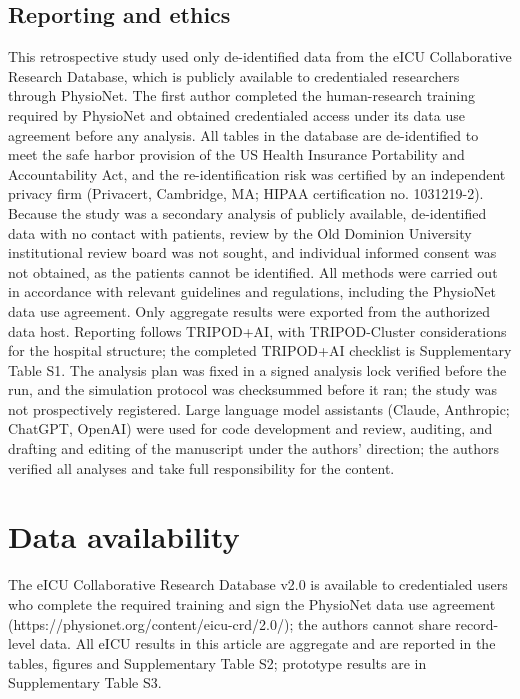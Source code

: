 \documentclass[11pt]{article}
\begin{document}
\subsection*{Reporting and ethics}
This retrospective study used only de-identified data from the eICU Collaborative Research Database, which is publicly available to credentialed researchers through PhysioNet\cite{r1}. The first author completed the human-research training required by PhysioNet and obtained credentialed access under its data use agreement before any analysis. All tables in the database are de-identified to meet the safe harbor provision of the US Health Insurance Portability and Accountability Act, and the re-identification risk was certified by an independent privacy firm (Privacert, Cambridge, MA; HIPAA certification no. 1031219-2)\cite{r2}. Because the study was a secondary analysis of publicly available, de-identified data with no contact with patients, review by the Old Dominion University institutional review board was not sought, and individual informed consent was not obtained, as the patients cannot be identified. All methods were carried out in accordance with relevant guidelines and regulations, including the PhysioNet data use agreement. Only aggregate results were exported from the authorized data host. Reporting follows TRIPOD+AI, with TRIPOD-Cluster considerations for the hospital structure\cite{r9,r19}; the completed TRIPOD+AI checklist is Supplementary Table S1. The analysis plan was fixed in a signed analysis lock verified before the run, and the simulation protocol was checksummed before it ran; the study was not prospectively registered. Large language model assistants (Claude, Anthropic; ChatGPT, OpenAI) were used for code development and review, auditing, and drafting and editing of the manuscript under the authors' direction; the authors verified all analyses and take full responsibility for the content.

\section*{Data availability}
The eICU Collaborative Research Database v2.0 is available to credentialed users who complete the required training and sign the PhysioNet data use agreement (https://physionet.org/content/eicu-crd/2.0/); the authors cannot share record-level data. All eICU results in this article are aggregate and are reported in the tables, figures and Supplementary Table S2; prototype results are in Supplementary Table S3.
\end{document}
